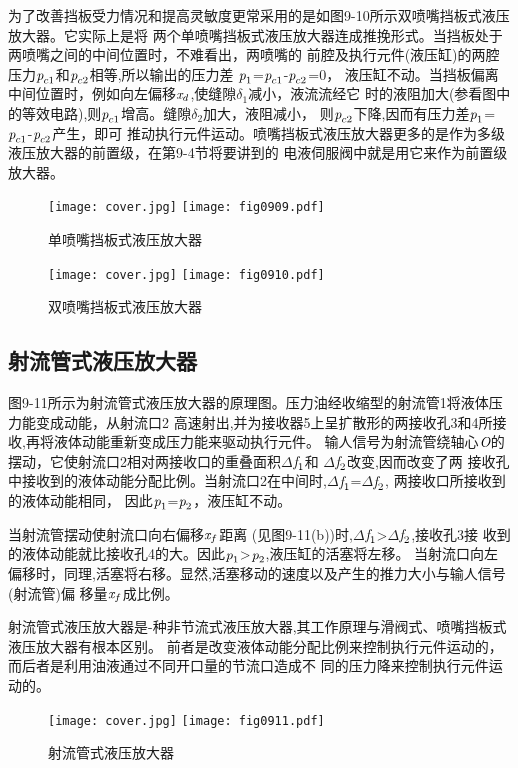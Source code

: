  为了改善挡板受力情况和提高灵敏度更常采用的是如图9-10所示双喷嘴挡板式液压放大器。它实际上是将
 两个单喷嘴挡板式液压放大器连成推挽形式。当挡板处于两喷嘴之间的中间位置时，不难看出，两喷嘴的
 前腔及执行元件(液压缸)的两腔压力$\emph{p}_{c1}$和$\emph{p}_{c2}$相等,所以输出的压力差
 $\emph{p}_1$=$\emph{p}_{c1}$-$\emph{p}_{c2}$=0，
 液压缸不动。当挡板偏离中间位置时，例如向左偏移$\emph{x}_d$,使缝隙$\delta_1$减小，液流流经它
 时的液阻加大(参看图中的等效电路),则$\emph{p}_{c1}$增高。缝隙$\delta_2$加大，液阻减小，
 则$\emph{p}_{c2}$下降,因而有压力差$\emph{p}_1$=$\emph{p}_{c1}$-$\emph{p}_{c2}$产生，即可
 推动执行元件运动。喷嘴挡板式液压放大器更多的是作为多级液压放大器的前置级，在第9-4节将要讲到的
 电液伺服阀中就是用它来作为前置级放大器。
 \begin{figure}
   \ifOpenSource
   \texttt{[image: cover.jpg]}
   \else
   \texttt{[image: fig0909.pdf]}
   \fi
   \caption{单喷嘴挡板式液压放大器}
   \label{fig:fig0909}
\end{figure}
\begin{figure}
   \ifOpenSource
   \texttt{[image: cover.jpg]}
   \else
   \texttt{[image: fig0910.pdf]}
   \fi
   \caption{双喷嘴挡板式液压放大器}
   \label{fig:fig0910}
\end{figure}
 \subsection{射流管式液压放大器}
 图9-11所示为射流管式液压放大器的原理图。压力油经收缩型的射流管1将液体压力能变成动能，从射流口2
 高速射出,并为接收器5上呈扩散形的两接收孔3和4所接收,再将液体动能重新变成压力能来驱动执行元件。
 输人信号为射流管绕轴心$\emph{O}$的摆动，它使射流口2相对两接收口的重叠面积$\Delta$$\emph{f}_1$和
 $\Delta$$\emph{f}_2$改变,因而改变了两
 接收孔中接收到的液体动能分配比例。当射流口2在中间时,$\Delta$$\emph{f}_1$=$\Delta$$\emph{f}_2$,
 两接收口所接收到的液体动能相同，
 因此$\emph{p}_1$=$\emph{p}_2$，液压缸不动。
 
 当射流管摆动使射流口向右偏移$\emph{x}_f$距离
 (见图9-11(b))时,$\Delta$$\emph{f}_1$\textgreater $\Delta$$\emph{f}_2$,接收孔3接
 收到的液体动能就比接收孔4的大。因此$\emph{p}_1$\textgreater $\emph{p}_2$,液压缸的活塞将左移。
 当射流口向左偏移时，同理,活塞将右移。显然,活塞移动的速度以及产生的推力大小与输人信号(射流管)偏
 移量$\emph{x}_f$成比例。

 射流管式液压放大器是-种非节流式液压放大器,其工作原理与滑阀式、喷嘴挡板式液压放大器有根本区别。
 前者是改变液体动能分配比例来控制执行元件运动的，而后者是利用油液通过不同开口量的节流口造成不
 同的压力降来控制执行元件运动的。
 \begin{figure}
   \ifOpenSource
   \texttt{[image: cover.jpg]}
   \else
   \texttt{[image: fig0911.pdf]}
   \fi
   \caption{射流管式液压放大器}
   \label{fig:fig0911}
\end{figure}

